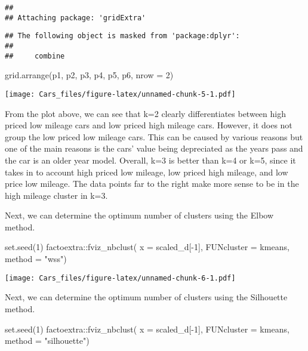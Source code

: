 \documentclass[
]{article}
\newenvironment{Shaded}{\begin{snugshade}}{\end{snugshade}}
\newcommand{\AttributeTok}[1]{\textcolor[rgb]{0.77,0.63,0.00}{#1}}
\newcommand{\DecValTok}[1]{\textcolor[rgb]{0.00,0.00,0.81}{#1}}
\newcommand{\FunctionTok}[1]{\textcolor[rgb]{0.00,0.00,0.00}{#1}}
\newcommand{\NormalTok}[1]{#1}
\newcommand{\SpecialCharTok}[1]{\textcolor[rgb]{0.00,0.00,0.00}{#1}}
\newcommand{\StringTok}[1]{\textcolor[rgb]{0.31,0.60,0.02}{#1}}
\begin{document}
\begin{verbatim}
## 
## Attaching package: 'gridExtra'
\end{verbatim}

\begin{verbatim}
## The following object is masked from 'package:dplyr':
## 
##     combine
\end{verbatim}

\begin{Shaded}
\begin{Highlighting}[]
\FunctionTok{grid.arrange}\NormalTok{(p1, p2, p3, p4, p5, p6, }\AttributeTok{nrow =} \DecValTok{2}\NormalTok{)}
\end{Highlighting}
\end{Shaded}

\texttt{[image: Cars\_files/figure-latex/unnamed-chunk-5-1.pdf]}

From the plot above, we can see that k=2 clearly differentiates between
high priced low mileage cars and low priced high mileage cars. However,
it does not group the low priced low mileage cars. This can be caused by
various reasons but one of the main reasons is the cars' value being
depreciated as the years pass and the car is an older year model.
Overall, k=3 is better than k=4 or k=5, since it takes in to account
high priced low mileage, low priced high mileage, and low price low
mileage. The data points far to the right make more sense to be in the
high mileage cluster in k=3.

Next, we can determine the optimum number of clusters using the Elbow
method.

\begin{Shaded}
\begin{Highlighting}[]
\FunctionTok{set.seed}\NormalTok{(}\DecValTok{1}\NormalTok{)}
\NormalTok{factoextra}\SpecialCharTok{::}\FunctionTok{fviz\_nbclust}\NormalTok{(}
  \AttributeTok{x =}\NormalTok{ scaled\_d[}\SpecialCharTok{{-}}\DecValTok{1}\NormalTok{],}
  \AttributeTok{FUNcluster =}\NormalTok{ kmeans,}
  \AttributeTok{method =} \StringTok{"wss"}\NormalTok{)}
\end{Highlighting}
\end{Shaded}

\texttt{[image: Cars\_files/figure-latex/unnamed-chunk-6-1.pdf]}

Next, we can determine the optimum number of clusters using the
Silhouette method.

\begin{Shaded}
\begin{Highlighting}[]
\FunctionTok{set.seed}\NormalTok{(}\DecValTok{1}\NormalTok{)}
\NormalTok{factoextra}\SpecialCharTok{::}\FunctionTok{fviz\_nbclust}\NormalTok{(}
  \AttributeTok{x =}\NormalTok{ scaled\_d[}\SpecialCharTok{{-}}\DecValTok{1}\NormalTok{],}
  \AttributeTok{FUNcluster =}\NormalTok{ kmeans,}
  \AttributeTok{method =} \StringTok{"silhouette"}\NormalTok{)}
\end{Highlighting}
\end{Shaded}
\end{document}
